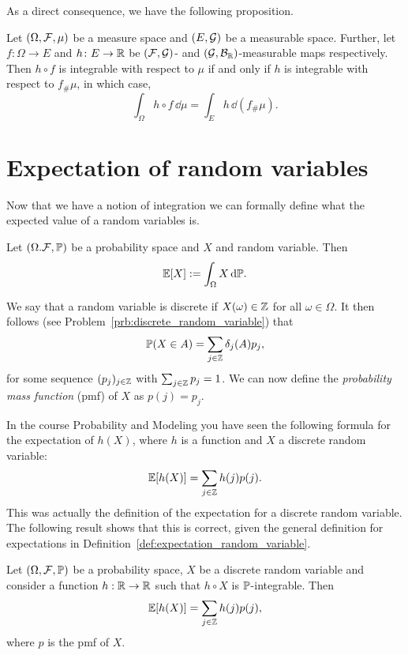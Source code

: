 \bigskip

As a direct consequence, we have the following proposition.
\begin{proposition}
Let $(\Omega, \mathcal F, \mu)$ be a measure space and $(E,\mathcal G)$ be a measurable space. Further, let $f\colon \Omega \to E$ and $h\colon E \to \mathbb R$ be $(\mathcal F,\mathcal G)$- and $(\mathcal G,\mathcal B_{\mathbb R})$-measurable maps respectively. Then $h \circ f$ is integrable with respect to $\mu$ if and only if $h$ is integrable with respect to $f_\# \mu$, in which case,
\[
\int_\Omega h \circ f\, \dd \mu = \int_E h \, \dd (f_\# \mu).
\]
\end{proposition}

\section{Expectation of random variables}

Now that we have a notion of integration we can formally define what the expected value of a random variables is.

\begin{definition}\label{def:expectation_random_variable}
Let $(\Omega. \mathcal F, \mathbb P)$ be a probability space and $X$ and random variable. Then
\[
	\mathbb E[X] := \int_\Omega X \, \mathrm{d} \mathbb P.
\]
\end{definition}

We say that a random variable is discrete if $X(\omega) \in \mathbb Z$ for all $\omega \in \Omega$. It then follows (see Problem~\ref{prb:discrete_random_variable}) that 
\[
	\mathbb P(X \in A) = \sum_{j \in \mathbb Z} \delta_j(A) p_j,
\]
for some sequence $(p_j)_{j \in \mathbb Z}$ with $\sum_{j \in \mathbb Z} p_j = 1$. We can now define the \emph{probability mass function} (pmf) of $X$ as $p(j) = p_j$.

In the course Probability and Modeling you have seen the following formula for the expectation of $h(X)$, where $h$ is a function and $X$ a discrete random variable:
\[
	\mathbb E[h(X)] = \sum_{j \in \mathbb Z} h(j) p(j).
\] 
This was actually the definition of the expectation for a discrete random variable. The following result shows that this is correct, given the general definition for expectations in Definition~\ref{def:expectation_random_variable}.


\begin{lemma}
Let $(\Omega, \mathcal F, \mathbb{P})$ be a probability space, $X$ be a discrete random variable and consider a function $h : \mathbb R \to \mathbb R$ such that $h\circ X$ is $\mathbb P$-integrable. Then
\[
	\mathbb E[h(X)] = \sum_{j \in \mathbb Z} h(j) p(j),
\] 
where $p$ is the pmf of $X$.
\end{lemma}

